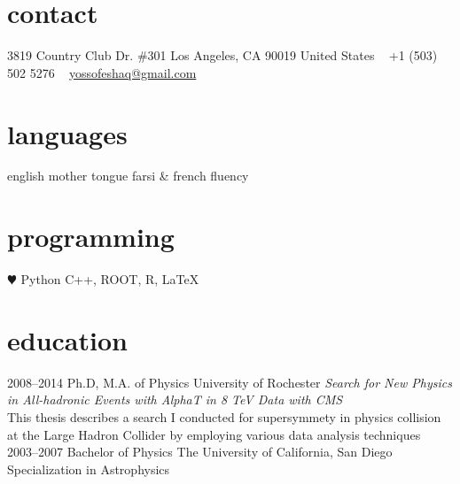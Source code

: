 \documentclass[]{friggeri-cv} %
\begin{document}


\begin{aside} %
\section{contact}
\footnotesize{3819 Country Club Dr. \#301
Los Angeles, CA 90019
United States}
~
+1 (503) 502 5276
~
\href{mailto:yossofeshaq@gmail.com}{yossofeshaq@gmail.com}
\section{languages}
english mother tongue
farsi \& french fluency
\section{programming}
{\color{red} $\varheartsuit$} Python
C++, ROOT, R, LaTeX
\end{aside}


\section{education}

\begin{entrylist}
\entry
{2008--2014}
{Ph.D, M.A. {\normalfont of Physics}}
{University of Rochester}
{\emph{Search for New Physics in All-hadronic Events with AlphaT in 8 TeV Data with CMS} \\ This thesis describes a search I conducted for supersymmety in physics collision at the Large Hadron Collider by employing various data analysis techniques}
~~\\
\entry
{2003--2007}
{Bachelor {\normalfont of Physics}}
{The University of California, San Diego}
{Specialization in Astrophysics}
\end{entrylist}
\end{document}
